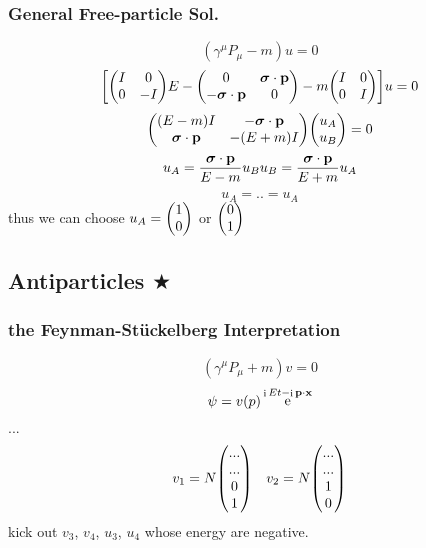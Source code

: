 \documentclass[a4paper]{article}
\DeclareMathOperator{\e}{\mathrm{e}}
\DeclareMathOperator{\I}{\mathrm{i}}
\numberwithin{equation}{section}
\begin{document}
\subsubsection{General Free-particle Sol.}
\begin{equation}\label{key}
(\gamma^\mu P_\mu - m)u = 0
\end{equation}
\begin{equation}\label{key}
\mqty[\mqty(I& 0\\0 & -I) E 
      - \mqty(0 & \bm\sigma\cdot\vb{p}\\
              -\bm\sigma\cdot\vb{p} & 0)
      - m\mqty(I & 0\\0 & I)] u = 0
\end{equation}
\begin{equation}\label{key}
\mqty((E - m)I & -\bm\sigma\cdot\vb{p}\\
      \bm\sigma\cdot\vb{p} & -(E + m)I) \mqty(u_A\\u_B) = 0
\end{equation}
\begin{equation}\label{uaub}
u_A = \dfrac{\bm\sigma\cdot\vb{p}}{E - m}u_B \\
u_B = \dfrac{\bm\sigma\cdot\vb{p}}{E + m}u_A
\end{equation}
\begin{equation}\label{key}
u_A = .. = u_A
\end{equation}
thus we can choose $ u_A = \mqty(1\\0) $ or $ \mqty(0\\1) $


\subsection{Antiparticles $ \bigstar $}
\subsubsection{}
\subsubsection{the Feynman-St\"uckelberg Interpretation}
\begin{equation}\label{key}
(\gamma^\mu P_\mu + m)v = 0
\end{equation}
\begin{equation}\label{key}
\psi = v(p)\e^{\I Et - \I\vb{p}\cdot\vb{x}}
\end{equation}
...
\begin{equation}\label{key}
v_1 = N\mqty(...\\...\\0\\1) \quad v_2 = N\mqty(...\\...\\1\\0)
\end{equation}
kick out $ v_3 $, $ v_4 $, $ u_3 $, $ u_4 $ whose energy are negative.
\end{document}
